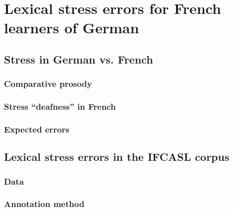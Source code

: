 %
%

\chapter{Lexical stress errors for French learners of German}



\section{Stress in German vs. French }
	\subsection{Comparative prosody}
	\subsection{Stress ``deafness'' in French}
	\subsection{Expected errors}
	
	
	
\section{Lexical stress errors in the IFCASL corpus} 

	\subsection{Data}

	\subsection{Annotation method}


